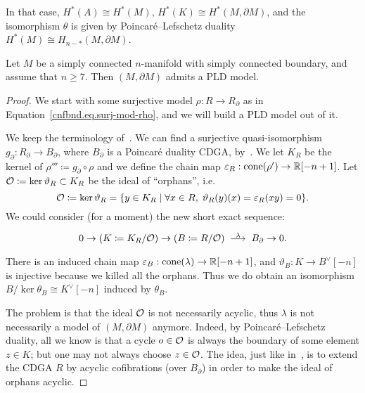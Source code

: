 \begin{remark}
  In that case, $H^{*}(A) \cong H^{*}(M)$, $H^{*}(K) \cong H^{*}(M, \partial M)$, and the isomorphism $\theta$ is given by Poincaré--Lefschetz duality $H^{*}(M) \cong H_{n-*}(M, \partial M)$.
\end{remark}

\begin{proposition}
  \label{cnfbnd.prop.more-general-model}
  Let $M$ be a simply connected $n$-manifold with simply connected boundary, and assume that $n \geq 7$.
  Then $(M, \partial M)$ admits a PLD model.
\end{proposition}

\begin{proof}
  We start with  some surjective model $\rho : R \to R_{\partial}$ as in Equation~\eqref{cnfbnd.eq.surj-mod-rho}, and we will build a PLD model out of it.

  We keep the terminology of~\cite{LambrechtsStanley2008}.
  We can find a surjective quasi-iso\-mor\-phism $g_{\partial} : R_{\partial} \to B_{\partial}$, where $B_{\partial}$ is a Poincaré duality CDGA, by~\cite{LambrechtsStanley2008}.
  We let $K_{R}$ be the kernel of $\rho''' \coloneqq g_{\partial} \circ \rho$ and we define the chain map $\varepsilon_{R} : \operatorname{cone}(\rho') \to \mathbb{R}[-n+1]$.
  Let $\mathcal{O} \coloneqq \ker \vartheta_{R} \subset K_{R}$ be the ideal of ``orphans'', i.e.\
  \begin{equation}
    \mathcal{O} \coloneqq \ker \vartheta_{R} = \{ y \in K_{R} \mid \forall x \in R, \; \vartheta_{R}(y)(x) = \varepsilon_{R}(xy) = 0 \}.
  \end{equation}
  We could consider (for a moment) the new short exact sequence:
  \begin{equation}
    0 \to (K \coloneqq K_{R}/\OO) \to (B \coloneqq R/\OO) \tkrightarrow{\lambda} B_{\partial} \to 0.
  \end{equation}
  There is an induced chain map $\varepsilon_{B} : \operatorname{cone}(\lambda) \to \mathbb{R}[-n+1]$, and $\vartheta_{B} : K \to B^{\vee}[-n]$ is injective because we killed all the orphans.
  Thus we do obtain an isomorphism $B / \ker \theta_{B} \cong K^{\vee}[-n]$ induced by $\theta_{B}$.

  The problem is that the ideal $\mathcal{O}$ is not necessarily acyclic, thus $\lambda$ is not necessarily a model of $(M, \partial M)$ anymore.
  Indeed, by Poincaré--Lefschetz duality, all we know is that a cycle $o \in \mathcal{O}$ is always the boundary of some element $z \in K$; but one may not always choose $z \in \mathcal{O}$.
  The idea, just like in~\cite{LambrechtsStanley2008}, is to extend the CDGA $R$ by acyclic cofibrations (over $B_{\partial}$) in order to make the ideal of orphans acyclic.


\end{proof}
